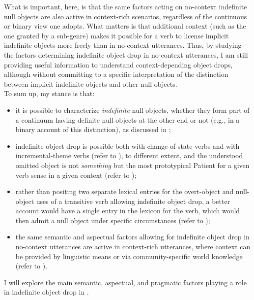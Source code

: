 What is important, here, is that the same factors acting on no-context indefinite null objects are also active in context-rich scenarios, regardless of the continuous or binary view one adopts. What matters is that additional context (such as the one granted by a sub-genre) makes it possible for a verb to license implicit indefinite objects more freely than in no-context utterances. Thus, by studying the factors determining indefinite object drop in no-context utterances, I am still providing useful information to understand context-depending object drops, although without committing to a specific interpretation of the distinction between implicit indefinite objects and other null objects.\\
To sum up, my stance is that:
\begin{itemize}
    \item it is possible to characterize \textit{indefinite} null objects, whether they form part of a continuum having definite null objects at the other end or not (e.g., in a binary account of this distinction), as discussed in ;
    \item indefinite object drop is possible both with change-of-state verbs and with incremental-theme verbs (refer to ), to different extent, and the understood omitted object is not \textit{something} but the most prototypical Patient for a given verb sense in a given context (refer to );
    \item rather than positing two separate lexical entries for the overt-object and null-object uses of a transitive verb allowing indefinite object drop, a better account would have a single entry in the lexicon for the verb, which would then admit a null object under specific circumstances (refer to );
    \item the same semantic and aspectual factors allowing for indefinite object drop in no-context utterances are active in context-rich utterances, where context can be provided by linguistic means or via community-specific world knowledge (refer to ).
\end{itemize}

I will explore the main semantic, aspectual, and pragmatic factors playing a role in indefinite object drop in .